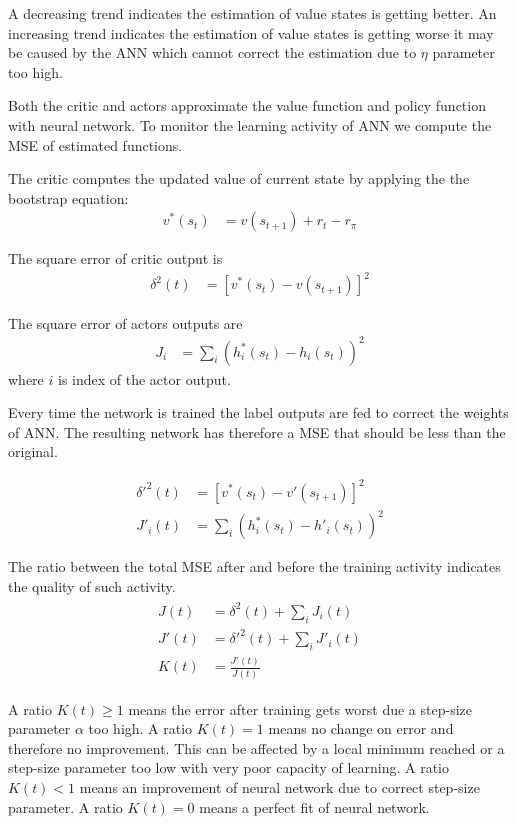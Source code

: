 \documentclass[]{article}
\begin{document}
A decreasing trend indicates the estimation of value states is getting better.
An increasing trend indicates the estimation of value states is getting worse it may be caused by the ANN which cannot correct the estimation due to $ \eta $ parameter too high.

Both the critic and actors approximate the value function and policy function with neural network.
To monitor the learning activity of ANN we compute the MSE of estimated functions.

The critic computes the updated value of current state by applying the the bootstrap equation:
\begin{align*}
	v^*(s_t)&	= v(s_{t+1}) + r_t - r_\pi 
\end{align*}

The square error of critic output is
\begin{align*}
	\delta^2(t)&	= [v^*(s_t) - v(s_{t+1})]^2
\end{align*}

The square error of actors outputs are
\begin{align*}
	J_i&	= \sum_i (h_i^*(s_t) - h_i(s_t))^2
\end{align*}
where $ i $ is index of the actor output.

Every time the network is trained the label outputs are fed to correct the weights of ANN.
The resulting network has therefore a MSE that should be less than the original.

\begin{align*}
	\delta'^2(t)&	= [v^*(s_t) - v'(s_{t+1})]^2
	\\
	J'_i(t)&		= \sum_i (h_i^*(s_t) - h'_i(s_t))^2
\end{align*}

The ratio between the total MSE after and before the training activity indicates the quality of such activity.
\begin{align}
\begin{split}
	J(t)&		= \delta^2(t) + \sum_i J_i(t)
	\\
	J'(t)&	= \delta'^2(t) + \sum_i J'_i(t)
	\\
	K(t)&	= \frac{J'(t)}{J(t)}
\end{split}
\end{align}

A ratio $ K(t) \ge 1 $ means the error after training gets worst due a step-size parameter $ \alpha $ too high.
A ratio $ K(t) = 1 $  means no change on error and therefore no improvement. This can be affected by a local minimum reached or a step-size parameter too low with very poor capacity of learning.
A ratio $ K(t) < 1 $ means an improvement of neural network due to correct step-size parameter.
A ratio $ K(t) = 0 $ means a perfect fit of neural network.
\end{document}
